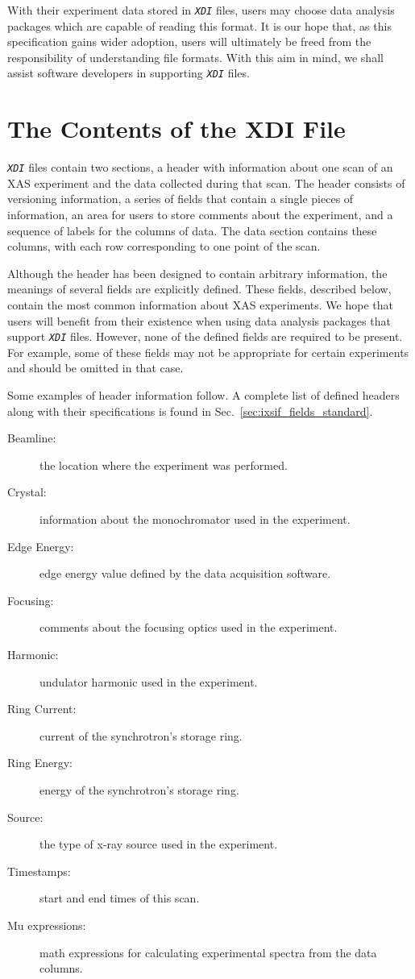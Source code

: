 \documentclass{article}
\newcommand{\sltt}[1]{\texttt{\textsl{#1}}}
\newcommand{\xdi}{\sltt{XDI}}
\begin{document}
With their experiment data stored in {\xdi} files, users may choose
data analysis packages which are capable of reading this format.  It
is our hope that, as this specification gains wider adoption, users
will ultimately be freed from the responsibility of understanding file
formats.  With this aim in mind, we shall assist software developers
in supporting {\xdi} files.


\section{The Contents of the XDI File}
\label{sec:contents_ixsif}

{\xdi} files contain two sections, a header with information about one
scan of an XAS experiment and the data collected during that scan.
The header consists of versioning information, a series of fields that
contain a single pieces of information, an area for users to store
comments about the experiment, and a sequence of labels for the
columns of data.  The data section contains these columns, with each
row corresponding to one point of the scan.

Although the header has been designed to contain arbitrary
information, the meanings of several fields are explicitly defined.
These fields, described below, contain the most common information
about XAS experiments.  We hope that users will benefit from their
existence when using data analysis packages that support {\xdi}
files.  However, none of the defined fields are required to be
present.  For example, some of these fields may not be appropriate for
certain experiments and should be omitted in that case.

Some examples of header information follow.  A complete list of
defined headers along with their specifications is found in
Sec.~\ref{sec:ixsif_fields_standard}.

\begin{description}
\item[Beamline:] the location where the experiment was performed.
\item[Crystal:] information about the monochromator used in the
  experiment.
\item[Edge Energy:] edge energy value defined by the data acquisition
  software.
\item[Focusing:] comments about the focusing optics used in the
  experiment.
\item[Harmonic:] undulator harmonic used in the experiment.
\item[Ring Current:] current of the synchrotron's storage ring.
\item[Ring Energy:] energy of the synchrotron's storage ring.
\item[Source:] the type of x-ray source used in the experiment.
\item[Timestamps:] start and end times of this scan.
\item[Mu expressions:] math expressions for calculating experimental
  spectra from the data columns.
\end{description}
\end{document}
